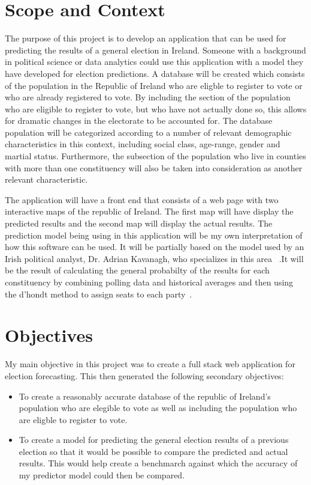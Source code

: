\section{Scope and Context}
The purpose of this project is to develop an application that can be used for predicting the results of a general election in Ireland. Someone with a background in political science or data analytics could use this application with a model they have developed for election predictions. A database will be created which consists of the population in the Republic of Ireland who are eligble to register to vote or who are already registered to vote.  By including the section of the population who are eligible to register to vote, but who have not actually done so, this allows for dramatic changes in the electorate to be accounted for. The database population will be categorized according to a number of relevant demographic characteristics in this context, including  social class, age-range, gender and martial status. Furthermore, the subsection of the population who live in counties with more than one constituency will also be taken into consideration as another relevant characteristic. 

The application will have a front end that consists of a web page with two interactive maps of the republic of Ireland. The first map will have display the predicted results and the second map will display the actual results. The prediction model being using in this application will be my own interpretation of how this software can be used.  It will be partially based on the model used by an Irish political analyst, Dr. Adrian Kavanagh, who specializes in this area ~\cite{adrian}.It will be the result of  calculating the general probabilty of the results for each constituency by combining polling data and historical averages and then using the d’hondt method to assign seats to each party~\cite{adrian}.

\section{Objectives}
My main objective in this project was to create a full stack web application for election forecasting. This then generated the following secondary objectives:
\begin{itemize}
	\item To create a reasonably accurate database of the republic of Ireland’s population who are elegible to vote as well as including the population who are eligble to register to vote.
	\item To create a model for predicting the general election results of a previous election so that it would be possible to compare the predicted and actual results. This would help create a benchmarch against which the accuracy of my predictor model could then be compared.
\end{itemize}

